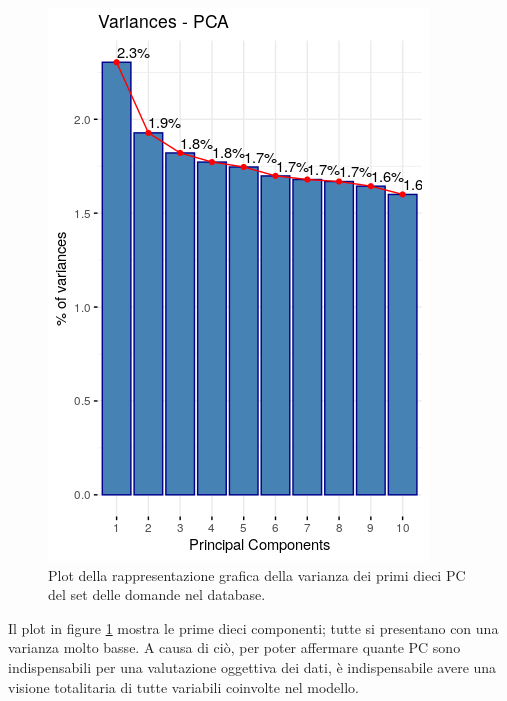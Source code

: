 \begin{figure}[H]
\centering
	\includegraphics[width=0.60\linewidth]{../../PCA/plot/variances_rete-db.png}
	\caption{Plot della rappresentazione grafica della varianza dei primi dieci PC del set delle domande nel database.}
	\label{Plot della rappresentazione grafica della varianza, dei primi dieci PC, del set delle domande nel database.}
\end{figure}
\noindent
Il plot in figure \ref{Plot della rappresentazione grafica della varianza, dei primi dieci PC, del set delle domande nel database.} mostra le prime dieci componenti; tutte si presentano con una varianza molto basse. A causa di ci\`o, per poter affermare quante PC sono indispensabili per una valutazione oggettiva dei dati, \`e indispensabile avere una visione totalitaria di tutte variabili coinvolte nel modello.
